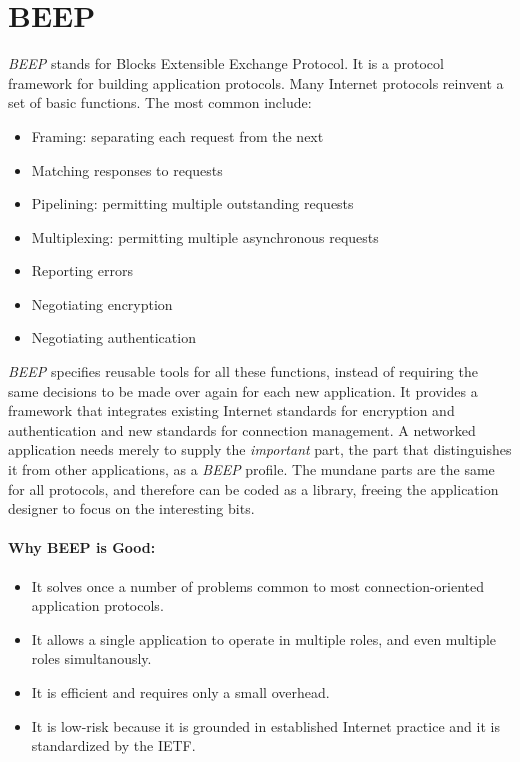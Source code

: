 \section{BEEP}
\label{sect:beep}

\emph{BEEP} stands for Blocks Extensible Exchange Protocol. It is a protocol framework for building application protocols. Many Internet protocols reinvent a set of basic functions. The most common include:

\begin{itemize}
 \item Framing: separating each request from the next
 \item Matching responses to requests
 \item Pipelining: permitting multiple outstanding requests
 \item Multiplexing: permitting multiple asynchronous requests
 \item Reporting errors
 \item Negotiating encryption
 \item Negotiating authentication
\end{itemize}

\emph{BEEP} specifies reusable tools for all these functions, instead of requiring the same decisions to be made over again for each new application. It provides a framework that integrates existing Internet standards for encryption and authentication and new standards for connection management. A networked application needs merely to supply the \emph{important} part, the part that distinguishes it from other applications, as a \emph{BEEP} profile. The mundane parts are the same for all protocols, and therefore can be coded as a library, freeing the application designer to focus on the interesting bits.

\paragraph{Why BEEP is Good:}
\begin{itemize}
 \item It solves once a number of problems common to most connection-oriented application protocols.
 \item It allows a single application to operate in multiple roles, and even multiple roles simultanously.
 \item It is efficient and requires only a small overhead.
 \item It is low-risk because it is grounded in established Internet practice and it is standardized by the IETF.
\end{itemize}


